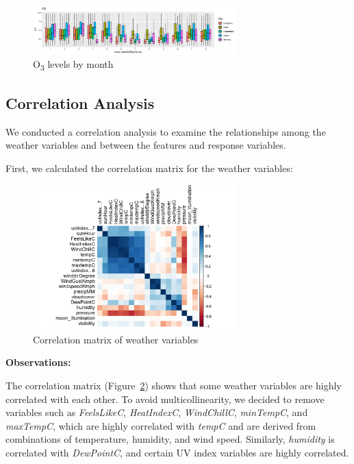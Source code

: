 \documentclass[12pt]{article}
\begin{document}
\begin{figure}[H]
    \centering
    \includegraphics[width=0.7\textwidth]{o3-by-month.png}
    \caption{O\textsubscript{3} levels by month}
    \label{fig:o3_by_month}
\end{figure}

\subsection{Correlation Analysis}

We conducted a correlation analysis to examine the relationships among the weather variables and between the features and response variables.

First, we calculated the correlation matrix for the weather variables:

\begin{figure}[H]
    \centering
    \includegraphics[width=0.7\textwidth]{correlation-matrix.png}
    \caption{Correlation matrix of weather variables}
    \label{fig:correlation_matrix}
\end{figure}

\textbf{Observations:}

The correlation matrix (Figure~\ref{fig:correlation_matrix}) shows that some weather variables are highly correlated with each other. To avoid multicollinearity, we decided to remove variables such as \textit{FeelsLikeC}, \textit{HeatIndexC}, \textit{WindChillC}, \textit{minTempC}, and \textit{maxTempC}, which are highly correlated with \textit{tempC} and are derived from combinations of temperature, humidity, and wind speed. Similarly, \textit{humidity} is correlated with \textit{DewPointC}, and certain UV index variables are highly correlated.
\end{document}
